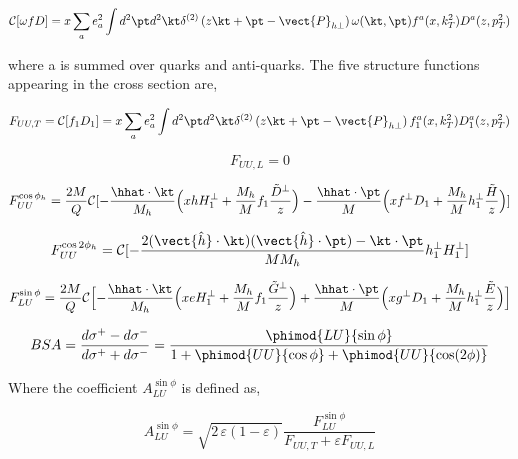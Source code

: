 \begin{equation}
  \mathcal{C}[\omega f D] = x \sum_{a} e^{2}_{a} \int d^{2}\pt d^{2}\kt \delta^{(2)} \left( z\kt + \pt - \vect{P}_{h\perp} \right) \omega (\kt, \pt) f^{a}(x, k_{T}^{2}) D^{a}(z, p_{T}^{2}) 
\end{equation}

where a is summed over quarks and anti-quarks.  The five structure functions appearing in the cross section are, 

\begin{equation}
F_{UU,T} = \mathcal{C}[f_1 D_1] = x \sum_{a} e^{2}_{a} \int d^{2} \pt d^{2} \kt \delta^{(2)} \left( z\kt + \pt - \vect{P}_{h\perp} \right) f_{1}^{a}(x, k_{T}^{2}) D_{1}^{a}(z, p_{T}^{2})
\end{equation}

\begin{equation}
F_{UU,L} = 0
\end{equation}

\begin{equation}
F_{UU}^{\cos \phi_h} = \frac{2M}{Q} \mathcal{C}[ - \frac{\hhat \cdot \kt}{M_h} \Bigl( x h H_{1}^{\perp} + \frac{M_h}{M} f_1 \frac{\tilde{D}^{\perp}}{z} \Bigr) - \frac{\hhat \cdot \pt}{M} \Bigl( x f^{\perp} D_1 + \frac{M_h}{M} h_1^{\perp} \frac{\tilde{H}}{z} \Bigr)]
\end{equation}

\begin{equation}
F_{UU}^{\cos 2\phi_h} = \mathcal{C}[- \frac{2 (\vect{\hat{h}} \cdot \kt) (\vect{\hat{h}} \cdot \pt) - \kt \cdot \pt}{M M_h} h_{1}^{\perp} H_{1}^{\perp} ]
\end{equation}

\begin{equation}
  F_{LU}^{\sin\phi} = \frac{2M}{Q} \mathcal{C} \Bigl[ -\frac{\hhat \cdot \kt}{M_h} \Bigl( xeH_1^\perp + \frac{M_h}{M} f_1 \frac{\tilde{G}^\perp}{z} \Bigr) + \frac{\hhat \cdot \pt}{M} \Bigl( xg^\perp D_1 + \frac{M_h}{M} h_{1}^{\perp} \frac{\tilde{E}}{z} \Bigr) \Bigr]
\end{equation}

\begin{equation}
  BSA = \frac{d\sigma^+ - d\sigma^-}{d\sigma^+ + d\sigma^-} = \frac{\phimod{LU}{\sin\phi}}{1 + \phimod{UU}{\cos\phi} + \phimod{UU}{\cos(2\phi)}}
\end{equation}

Where the coefficient $A_{LU}^{\sin\phi}$ is defined as, 

\begin{equation}
  A_{LU}^{\sin\phi} = \sqrt{2\,\varepsilon (1-\varepsilon)} \frac{F_{LU}^{\sin\phi}}{F_{UU,T} + \varepsilon F_{UU,L}}
\end{equation}
